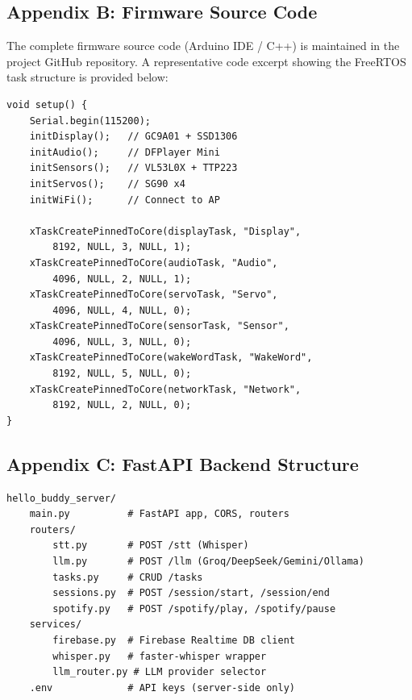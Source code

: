 \documentclass[12pt,a4paper]{article}
\begin{document}
\subsection*{Appendix B: Firmware Source Code}

The complete firmware source code (Arduino IDE / C++) is maintained in
the project GitHub repository. A representative code excerpt showing
the FreeRTOS task structure is provided below:

\begin{verbatim}
void setup() {
    Serial.begin(115200);
    initDisplay();   // GC9A01 + SSD1306
    initAudio();     // DFPlayer Mini
    initSensors();   // VL53L0X + TTP223
    initServos();    // SG90 x4
    initWiFi();      // Connect to AP

    xTaskCreatePinnedToCore(displayTask, "Display",
        8192, NULL, 3, NULL, 1);
    xTaskCreatePinnedToCore(audioTask, "Audio",
        4096, NULL, 2, NULL, 1);
    xTaskCreatePinnedToCore(servoTask, "Servo",
        4096, NULL, 4, NULL, 0);
    xTaskCreatePinnedToCore(sensorTask, "Sensor",
        4096, NULL, 3, NULL, 0);
    xTaskCreatePinnedToCore(wakeWordTask, "WakeWord",
        8192, NULL, 5, NULL, 0);
    xTaskCreatePinnedToCore(networkTask, "Network",
        8192, NULL, 2, NULL, 0);
}
\end{verbatim}

\subsection*{Appendix C: FastAPI Backend Structure}

\begin{verbatim}
hello_buddy_server/
    main.py          # FastAPI app, CORS, routers
    routers/
        stt.py       # POST /stt (Whisper)
        llm.py       # POST /llm (Groq/DeepSeek/Gemini/Ollama)
        tasks.py     # CRUD /tasks
        sessions.py  # POST /session/start, /session/end
        spotify.py   # POST /spotify/play, /spotify/pause
    services/
        firebase.py  # Firebase Realtime DB client
        whisper.py   # faster-whisper wrapper
        llm_router.py # LLM provider selector
    .env             # API keys (server-side only)
\end{verbatim}
\end{document}
